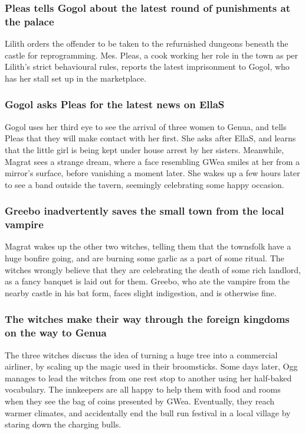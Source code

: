 \subsubsection{\Gls{Pleas} tells \Gls{Gogol} about the latest round of punishments at the palace}
\Gls{Lilith} orders the offender to be taken to the refurnished dungeons beneath the castle for
reprogramming. Mes. \Gls{Pleas}, a cook working her role in the town as per \Gls{Lilith}'s strict
behavioural rules, reports the latest imprisonment to \Gls{Gogol}, who has her stall set up in
the marketplace.

\subsubsection{\Gls{Gogol} asks \Gls{Pleas} for the latest news on \Gls{EllaS}}
\Gls{Gogol} uses her third eye to see the arrival of three women to Genua, and tells \Gls{Pleas}
that they will make contact with her first. She asks after \Gls{EllaS}, and learns that the little
girl is being kept under house arrest by her sisters. Meanwhile, \Gls{Magrat} sees a strange dream,
where a face resembling \Gls{GWea} smiles at her from a mirror's surface, before vanishing a moment
later. She wakes up a few hours later to see a band outside the tavern, seemingly celebrating some
happy occasion.

\subsubsection{\Gls{Greebo} inadvertently saves the small town from the local vampire}
\Gls{Magrat} wakes up the other two witches, telling them that the townsfolk have a huge bonfire
going, and are burning some garlic as a part of some ritual. The witches wrongly believe that they
are celebrating the death of some rich landlord, as a fancy banquet is laid out for them.
\Gls{Greebo}, who ate the vampire from the nearby castle in his bat form, faces slight indigestion,
and is otherwise fine.

\subsubsection{The witches make their way through the foreign kingdoms on the way to Genua}
The three witches discuss the idea of turning a huge tree into a commercial airliner, by scaling up
the magic used in their broomsticks. Some days later, \Gls{Ogg} manages to lead the witches from
one rest stop to another using her half-baked vocabulary. The innkeepers are all happy to help
them with food and rooms when they see the bag of coins presented by \Gls{GWea}. Eventually, they
reach warmer climates, and accidentally end the bull run festival in a local village by staring
down the charging bulls.

